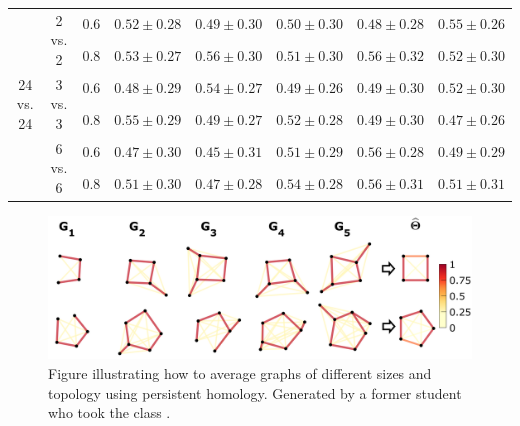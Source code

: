 \documentclass[12pt,portrait]{article}
\begin{document}
\begin{table}[t]
{\begin{tabular}{ccc|ccccc}
    \hline \hline
    
    \multirow{6}{*}{24 vs. 24} & \multirow{2}{*}{2 vs. 2}   & 0.6 & $ 0.52 \pm 0.28 $ & $ 0.49 \pm 0.30 $ & $ 0.50 \pm 0.30 $ & $ 0.48 \pm 0.28 $ & $ 0.55 \pm 0.26 $ \\
                                 &                            & 0.8 & $ 0.53 \pm 0.27 $ & $ 0.56 \pm 0.30 $ & $ 0.51 \pm 0.30 $ & $ 0.56 \pm 0.32 $ & $ 0.52 \pm 0.30 $ \\
                                 & \multirow{2}{*}{3 vs. 3}   & 0.6 & $ 0.48 \pm 0.29 $ & $ 0.54 \pm 0.27 $ & $ 0.49 \pm 0.26 $ & $ 0.49 \pm 0.30 $ & $ 0.52 \pm 0.30 $ \\
                                 &                            & 0.8 & $ 0.55 \pm 0.29 $ & $ 0.49 \pm 0.27 $ & $ 0.52 \pm 0.28 $ & $ 0.49 \pm 0.30 $ & $ 0.47 \pm 0.26 $ \\
                                 & \multirow{2}{*}{6 vs. 6} & 0.6 & $ 0.47 \pm 0.30 $ & $ 0.45 \pm 0.31 $ & $ 0.51 \pm 0.29 $ & $ 0.56 \pm 0.28 $ & $ 0.49 \pm 0.29 $ \\
                                 &                            & 0.8 & $ 0.51 \pm 0.30 $ & $ 0.47 \pm 0.28 $ & $ 0.54 \pm 0.28 $ & $ 0.56 \pm 0.31 $ & $ 0.51 \pm 0.31 $ \\

    \hline
    
\end{tabular}}
\end{table}


\begin{figure}
\includegraphics[width=1\linewidth]{toy_meantop.png}
\centering
\caption{\small Figure illustrating how to average graphs of different sizes and topology using persistent homology. Generated by a former student who took the class \citep{song.2020.arXiv}.}
\label{fig:meantop}
\end{figure}
\end{document}
